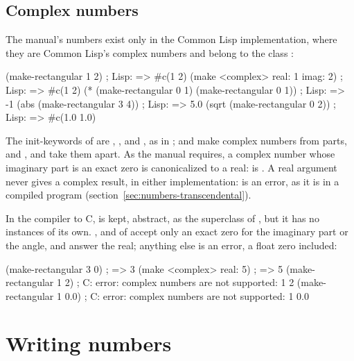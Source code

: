 \subsection{Complex numbers}

The manual's  numbers exist only in the Common Lisp
implementation, where they are Common Lisp's complex numbers and belong
to the class :

\begin{dylan}
(make-rectangular 1 2)                   ; Lisp: => #c(1 2)
(make <complex> real: 1 imag: 2)         ; Lisp: => #c(1 2)
(* (make-rectangular 0 1)
   (make-rectangular 0 1))               ; Lisp: => -1
(abs (make-rectangular 3 4))             ; Lisp: => 5.0
(sqrt (make-rectangular 0 2))            ; Lisp: => #c(1.0 1.0)
\end{dylan}

\noindent The init-keywords of  are ,
,  and , as in
;  and 
make complex numbers from parts, and ,
 and  take them apart. As the manual
requires, a complex number whose imaginary part is an exact zero is
canonicalized to a real:  is .
A real argument never gives a complex result, in either implementation:
 is an error, as it is in a compiled program
(section~\ref{sec:numbers-transcendental}).

In the compiler to C,  is kept, abstract, as the
superclass of , but it has no instances of its own.
,  and  of
 accept only an exact zero for the imaginary part or
the angle, and answer the real; anything else is an error, a float
zero included:

\begin{dylan}
(make-rectangular 3 0)     ; => 3
(make <complex> real: 5)   ; => 5
(make-rectangular 1 2)     ; C: error: complex numbers are not supported: 1 2
(make-rectangular 1 0.0)   ; C: error: complex numbers are not supported: 1 0.0
\end{dylan}

\section{Writing numbers}\label{sec:numbers-literals}

